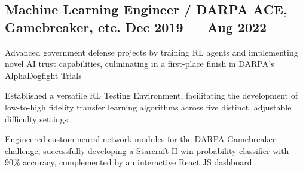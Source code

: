 \subsection{{Machine Learning Engineer / DARPA ACE, Gamebreaker, etc. \hfill Dec 2019 --- Aug 2022}}
\begin{zitemize}
	\item Advanced government defense projects by training RL agents and implementing novel AI trust capabilities, culminating in a first-place finish in DARPA's AlphaDogfight Trials
	\item Established a versatile RL Testing Environment, facilitating the development of low-to-high fidelity transfer learning algorithms across five distinct, adjustable difficulty settings
	\item Engineered custom neural network modules for the DARPA Gamebreaker challenge, successfully developing a Starcraft II win probability classifier with 90\% accuracy, complemented by an interactive React JS dashboard

\end{zitemize}



